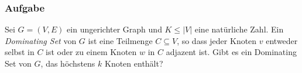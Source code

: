 \begin{frame}
\frametitle{Aufgabe}
Sei $G=(V, E)$ ein ungerichter Graph und $K \leq |V|$ eine natürliche Zahl. 
Ein \emph{Dominating Set} von $G$ ist eine Teilmenge $C \subseteq V$, so dass jeder Knoten $v$ entweder selbst in $C$ ist oder zu einem Knoten $w$ in $C$ adjazent ist. \micropause
Gibt es ein Dominating Set von $G$, das höchstens $k$ Knoten enthält?  \micropause

\begin{enumerate}

\end{enumerate}
\end{frame}

